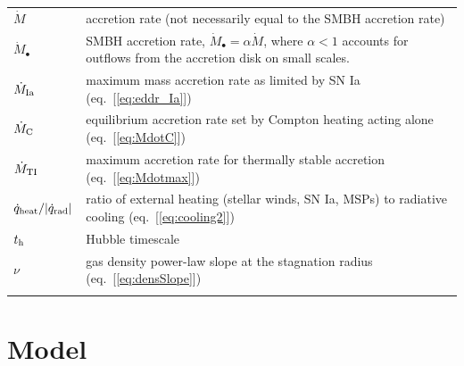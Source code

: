 \documentclass[usenatbib,fleqn]{mn2e}
\begin{document}
\begin{table}
\begin{threeparttable}
\begin{minipage}{18cm}
\begin{tabular}{ll}
$\dot{M}$ & accretion rate (not necessarily equal to the SMBH accretion rate)   \\
$\dot{M}_{\bullet}$ & SMBH accretion rate, $\dot{M}_{\bullet} = \alpha\dot{M}$, where $\alpha < 1$ accounts for outflows from the accretion disk on small scales.   \\
$\dot{M}_{\rm Ia}$ & maximum mass accretion rate as limited by SN Ia (eq.~[\ref{eq:eddr_Ia}]) \\
$\dot{M}_{\rm C}$ & equilibrium accretion rate set by Compton heating acting alone (eq.~[\ref{eq:MdotC}]) \\
$\dot{M}_{\rm TI}$ & maximum accretion rate for thermally stable accretion (eq.~[\ref{eq:Mdotmax}]) \\
$\dot{q}_{\rm heat}/|\dot{q}_{\rm rad}|$ & ratio of external heating (stellar winds, SN Ia, MSPs) to radiative cooling (eq.~[\ref{eq:cooling2}]) \\
$t_{\rm h}$ & Hubble timescale \\
$\nu$ & gas density power-law slope at the stagnation radius
(eq.~[\ref{eq:densSlope}]) \\
\hline
\label{table:definitions}  
\end{tabular}
\end{minipage}
\end{threeparttable}

\end{table}


\section{Model}
\label{sec:model}
\end{document}
